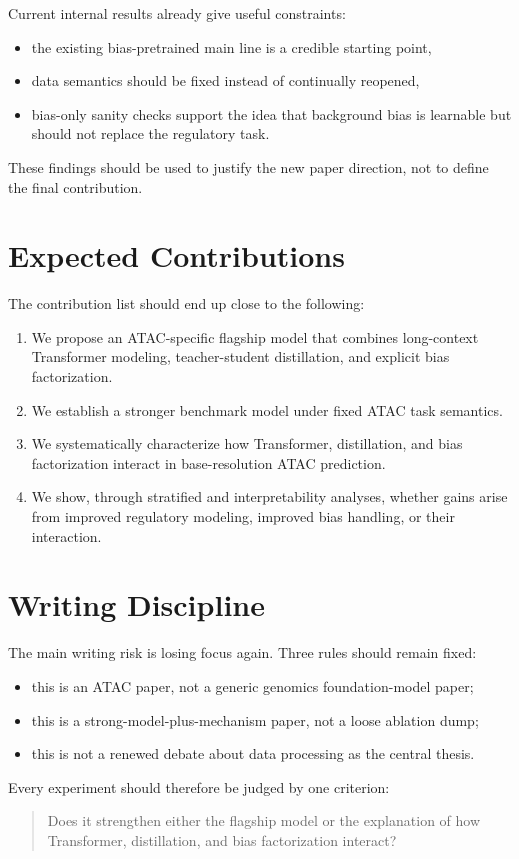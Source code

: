 \documentclass[11pt]{article}
\begin{document}
Current internal results already give useful constraints:
\begin{itemize}[leftmargin=2em]
  \item the existing bias-pretrained main line is a credible starting point,
  \item data semantics should be fixed instead of continually reopened,
  \item bias-only sanity checks support the idea that background bias is
  learnable but should not replace the regulatory task.
\end{itemize}

These findings should be used to justify the new paper direction, not to define
the final contribution.

\section{Expected Contributions}

The contribution list should end up close to the following:
\begin{enumerate}[leftmargin=2em]
  \item We propose an ATAC-specific flagship model that combines long-context
  Transformer modeling, teacher-student distillation, and explicit bias
  factorization.
  \item We establish a stronger benchmark model under fixed ATAC task semantics.
  \item We systematically characterize how Transformer, distillation, and bias
  factorization interact in base-resolution ATAC prediction.
  \item We show, through stratified and interpretability analyses, whether gains
  arise from improved regulatory modeling, improved bias handling, or their
  interaction.
\end{enumerate}

\section{Writing Discipline}

The main writing risk is losing focus again. Three rules should remain fixed:
\begin{itemize}[leftmargin=2em]
  \item this is an ATAC paper, not a generic genomics foundation-model paper;
  \item this is a strong-model-plus-mechanism paper, not a loose ablation dump;
  \item this is not a renewed debate about data processing as the central thesis.
\end{itemize}

Every experiment should therefore be judged by one criterion:
\begin{quote}
Does it strengthen either the flagship model or the explanation of how
Transformer, distillation, and bias factorization interact?
\end{quote}
\end{document}
